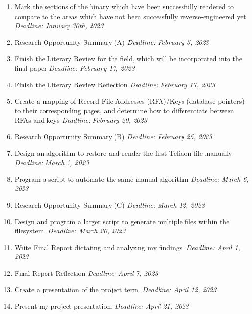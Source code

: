\documentclass[sigconf]{acmart}
\begin{document}
\begin{enumerate}
    \item Mark the sections of the binary which have been successfully rendered to compare to the areas which have not been successfully reverse-engineered yet
        \subitem \emph{Deadline: January 30th, 2023} \
    \item Research Opportunity Summary (A) 
        \subitem \emph{Deadline: February 5, 2023} \
    \item Finish the Literary Review for the field, which will be incorporated into the final paper 
        \subitem \emph{Deadline: February 17, 2023} \
    \item Finish the Literary Review Reflection 
        \subitem \emph{Deadline: February 17, 2023} \
    \item Create a mapping of Record File Addresses (RFA)/Keys (database pointers) to their corresponding pages, and determine how to differentiate between RFAs and keys 
        \subitem \emph{Deadline: February 20, 2023} \
    \item Research Opportunity Summary (B) 
        \subitem \emph{Deadline: February 25, 2023} \
    \item Design an algorithm to restore and render the first Telidon file manually 
        \subitem \emph{Deadline: March 1, 2023} \
    \item Program a script to automate the same manual algorithm 
        \subitem \emph{Deadline: March 6, 2023} \
    \item Research Opportunity Summary (C) 
        \subitem \emph{Deadline: March 12, 2023} \
    \item Design and program a larger script to generate multiple files within the filesystem.
        \subitem \emph{Deadline: March 20, 2023} \
    \item Write Final Report dictating and analyzing my findings.
        \subitem \emph{Deadline: April 1, 2023} \
    \item Final Report Reflection
        \subitem \emph{Deadline: April 7, 2023} \
    \item Create a presentation of the project term. 
        \subitem \emph{Deadline: April 12, 2023} \
    \item Present my project presentation.
        \subitem \emph{Deadline: April 21, 2023} \\
\end{enumerate}
\end{document}
